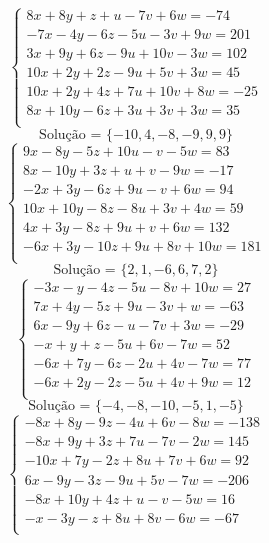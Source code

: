 \documentclass[12pt,oneside,a4paper]{article}
\begin{document}
\vspace{\baselineskip}
\begin{equation*}
\begin{cases}
8x+8y+z+u-7v+6w=-74 \\
-7x-4y-6z-5u-3v+9w=201 \\
3x+9y+6z-9u+10v-3w=102 \\
10x+2y+2z-9u+5v+3w=45 \\
10x+2y+4z+7u+10v+8w=-25 \\
8x+10y-6z+3u+3v+3w=35 \\
\end{cases}
\end{equation*}
\begin{equation*}
\text{Solução = }\{-10,4,-8,-9,9,9\}
\end{equation*}
\vspace{\baselineskip}
\begin{equation*}
\begin{cases}
9x-8y-5z+10u-v-5w=83 \\
8x-10y+3z+u+v-9w=-17 \\
-2x+3y-6z+9u-v+6w=94 \\
10x+10y-8z-8u+3v+4w=59 \\
4x+3y-8z+9u+v+6w=132 \\
-6x+3y-10z+9u+8v+10w=181 \\
\end{cases}
\end{equation*}
\begin{equation*}
\text{Solução = }\{2,1,-6,6,7,2\}
\end{equation*}
\vspace{\baselineskip}
\begin{equation*}
\begin{cases}
-3x-y-4z-5u-8v+10w=27 \\
7x+4y-5z+9u-3v+w=-63 \\
6x-9y+6z-u-7v+3w=-29 \\
-x+y+z-5u+6v-7w=52 \\
-6x+7y-6z-2u+4v-7w=77 \\
-6x+2y-2z-5u+4v+9w=12 \\
\end{cases}
\end{equation*}
\begin{equation*}
\text{Solução = }\{-4,-8,-10,-5,1,-5\}
\end{equation*}
\vspace{\baselineskip}
\begin{equation*}
\begin{cases}
-8x+8y-9z-4u+6v-8w=-138 \\
-8x+9y+3z+7u-7v-2w=145 \\
-10x+7y-2z+8u+7v+6w=92 \\
6x-9y-3z-9u+5v-7w=-206 \\
-8x+10y+4z+u-v-5w=16 \\
-x-3y-z+8u+8v-6w=-67 \\
\end{cases}
\end{equation*}
\end{document}
